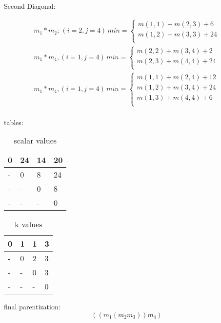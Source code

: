 \documentclass[titlepage]{article}\usepackage[]{graphicx}\usepackage[]{color}
\begin{document}
Second Diagonal:

\begin{align*}
	m_1 * m_2;\, (i = 2, j=4)\, min =  \begin{cases} 
				m(1,1) + m(2,3) + 6 \\
				m(1,2) + m(3,3) + 24 \\ 
			\end{cases} \\
	m_1 * m_4 , (i=1, j=4)\, min = \begin{cases}
				m(2,2) + m(3,4) + 2 \\
				m(2,3) + m(4,4) + 24 \\
			\end{cases} \\
	m_1 * m_4, (i =1, j=4 )\, min = \begin{cases}
				m(1,1) + m(2,4) + 12 \\
				m(1,2) + m(3,4) + 24 \\
				m(1,3) + m(4,4) + 6  \\
			\end{cases} \\
\end{align*}

tables:
\begin{table}[h]
	\caption{scalar values}
	\label{tab:mylabel}
	\begin{tabular}{|l|l|l|l|}
		\hline
		0 & 24 & 14 & 20 \\ \hline
		- & 0  & 8  & 24 \\ \hline
		- & -  & 0  & 8  \\ \hline
		- & -  & -  & 0  \\ \hline
	\end{tabular}
\end{table}

\begin{table}[h]
	\caption{k values}
	\label{tab:kval}
	\begin{tabular}{|l|l|l|l|}
		\hline
		0 & 1 & 1 & 3 \\ \hline
		- & 0  & 2  & 3 \\ \hline
		- & -  & 0  & 3  \\ \hline
		- & -  & -  & 0  \\ \hline
	\end{tabular}
\end{table}

final parentization:
\[ \left( (m_1 (m_2 m_3)) m_4 \right)\]
\end{document}
